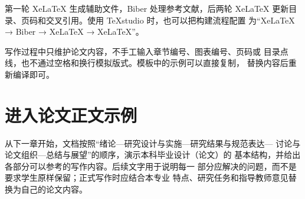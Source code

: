 第一轮 XeLaTeX 生成辅助文件，Biber 处理参考文献，后两轮 XeLaTeX
更新目录、页码和交叉引用。使用 TeXstudio 时，也可以把构建流程配置
为“XeLaTeX → Biber → XeLaTeX → XeLaTeX”。

写作过程中只维护论文内容，不手工输入章节编号、图表编号、页码或
目录点线，也不通过空格和换行模拟版式。模板中的示例可以直接复制，
替换内容后重新编译即可。

\section{进入论文正文示例}

从下一章开始，文档按照“绪论—研究设计与实施—研究结果与规范表达—
讨论与论文组织—总结与展望”的顺序，演示本科毕业设计（论文）的
基本结构，并给出各部分可以参考的写作内容。后续文字用于说明每一
部分应解决的问题，而不是要求学生原样保留；正式写作时应结合本专业
特点、研究任务和指导教师意见替换为自己的论文内容。
